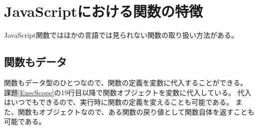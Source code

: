 \section{JavaScriptにおける関数の特徴}
JavaScript関数ではほかの言語では見られない関数の取り扱い方法がある。
\subsection{関数もデータ}
関数もデータ型のひとつなので、関数の定義を変数に代入することができる。
課題\ref{ExecScope}の19行目以降で関数オブジェクトを変数に代入している。
代入はいつでもできるので、実行時に関数の定義を変えることも可能である。
また、関数もオブジェクトなので、ある関数の戻り値として関数自体を返すことも可能である。
\iffalse
この使用法の例としてはある処理がブラウザごとに異なる作業を必要とするとき
に、それに適応した判定を1回だけしてあとは戻した関数を実行するだけにする
ことができる。%
\fi
